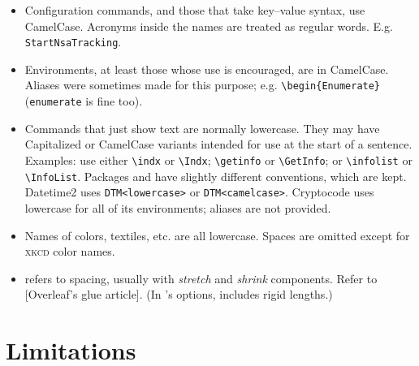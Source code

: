 \begin{BigPages} [hmargin=0.5cm, vmargin=1cm]
\begin{itemize}[long]
    \item Configuration commands, and those that take key--value syntax, use CamelCase.
          Acronyms inside the names are treated as regular words. E.g. \verb|StartNsaTracking|.
    \item Environments, at least those whose use is encouraged, are in CamelCase.
          Aliases were sometimes made for this purpose; e.g. \verb|\begin{Enumerate}|
          (\verb|enumerate| is fine too).
    \item Commands that just show text are normally lowercase. They may have Capitalized or CamelCase
          variants intended for use at the start of a sentence.
          Examples: use either \verb|\indx| or \verb|\Indx|; \verb|\getinfo| or \verb|\GetInfo|; or
          \verb|\infolist| or \verb|\InfoList|.
          Packages  and  have slightly different conventions, which are kept.
          Datetime2 uses \verb|DTM<lowercase>| or \verb|DTM<camelcase>|.
          Cryptocode uses lowercase for all of its environments; aliases are not provided.
    \item Names of colors, textiles, etc. are all lowercase. Spaces are omitted except for \textsc{xkcd} color names.
    \item {} refers to spacing, usually with \textit{stretch} and \textit{shrink} components.
          Refer to [Overleaf's glue article]. (In \desert's options,  includes rigid lengths.)
\end{itemize}

\section{Limitations}


\end{BigPages}

